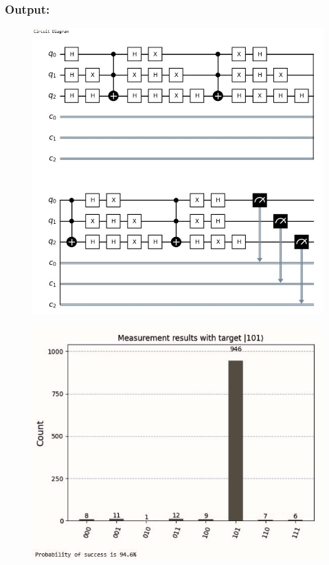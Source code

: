 \subsubsection{Output:}
\begin{figure}[H]
    \centering
    \includegraphics[width=\textwidth]{Grovers-circuit-diagram.png}
    \label{fig:output2}
\end{figure}

\begin{figure}[H]
    \centering
    \includegraphics[width=1.0\textwidth]{Grovers-measurement-results.png}
    \label{fig:output3}
\end{figure}